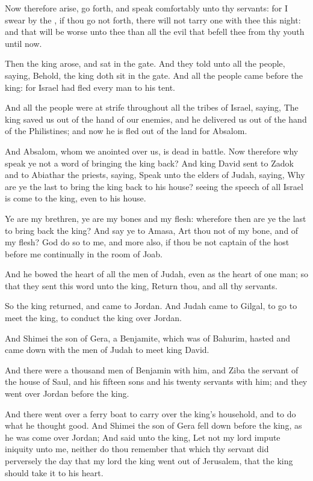 \verse Now therefore arise, go forth, and speak comfortably unto thy servants: for I swear by the \LORD, if thou go not forth, there will not tarry one with thee this night: and that will be worse unto thee than all the evil that befell thee from thy youth until now.

\verse Then the king arose, and sat in the gate. And they told unto all the people, saying, Behold, the king doth sit in the gate. And all the people came before the king: for Israel had fled every man to his tent.

\verse And all the people were at strife throughout all the tribes of Israel, saying, The king saved us out of the hand of our enemies, and he delivered us out of the hand of the Philistines; and now he is fled out of the land for Absalom.

\verse And Absalom, whom we anointed over us, is dead in battle. Now therefore why speak ye not a word of bringing the king back?  \verse And king David sent to Zadok and to Abiathar the priests, saying, Speak unto the elders of Judah, saying, Why are ye the last to bring the king back to his house? seeing the speech of all Israel is come to the king, even to his house.

\verse Ye are my brethren, ye are my bones and my flesh: wherefore then are ye the last to bring back the king?  \verse And say ye to Amasa, Art thou not of my bone, and of my flesh? God do so to me, and more also, if thou be not captain of the host before me continually in the room of Joab.

\verse And he bowed the heart of all the men of Judah, even as the heart of one man; so that they sent this word unto the king, Return thou, and all thy servants.

\verse So the king returned, and came to Jordan. And Judah came to Gilgal, to go to meet the king, to conduct the king over Jordan.

\verse And Shimei the son of Gera, a Benjamite, which was of Bahurim, hasted and came down with the men of Judah to meet king David.

\verse And there were a thousand men of Benjamin with him, and Ziba the servant of the house of Saul, and his fifteen sons and his twenty servants with him; and they went over Jordan before the king.

\verse And there went over a ferry boat to carry over the king's household, and to do what he thought good. And Shimei the son of Gera fell down before the king, as he was come over Jordan; \verse And said unto the king, Let not my lord impute iniquity unto me, neither do thou remember that which thy servant did perversely the day that my lord the king went out of Jerusalem, that the king should take it to his heart.

